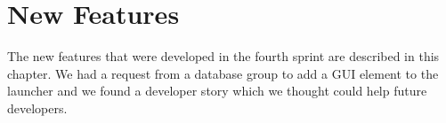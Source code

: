 
\chapter{New Features}
\label{cha:new_features}

The new features that were developed in the fourth sprint are described in this chapter. We had a request from a database group to add a GUI element to the launcher and we found a developer story which we thought could help future \giraf developers. 




